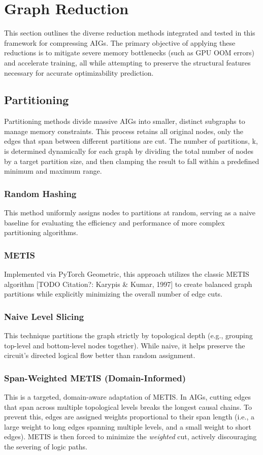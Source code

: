 \documentclass[paper=a4, fontsize=11pt]{scrartcl} %
\numberwithin{equation}{section} %
\numberwithin{figure}{section} %
\numberwithin{table}{section} %
\begin{document}
\section{Graph Reduction} 
This section outlines the diverse reduction methods integrated and tested in this framework for compressing AIGs. The primary objective of applying these reductions is to mitigate severe memory bottlenecks (such as GPU OOM errors) and accelerate training, all while attempting to preserve the structural features necessary for accurate optimizability prediction.


\subsection{Partitioning}
Partitioning methods divide massive AIGs into smaller, distinct subgraphs to manage memory constraints. This process retains all original nodes, only the edges that span between different partitions are cut. The number of partitions, k, is determined dynamically for each graph by dividing the total number of nodes by a target partition size, and then clamping the result to fall within a predefined minimum and maximum range.

\subsubsection{Random Hashing}
This method uniformly assigns nodes to partitions at random, serving as a naive baseline for evaluating the efficiency and performance of more complex partitioning algorithms.

\subsubsection{METIS}
Implemented via PyTorch Geometric, this approach utilizes the classic METIS algorithm [TODO Citation?: Karypis \& Kumar, 1997] to create balanced graph partitions while explicitly minimizing the overall number of edge cuts.

\subsubsection{Naive Level Slicing}
This technique partitions the graph strictly by topological depth (e.g., grouping top-level and bottom-level nodes together). While naive, it helps preserve the circuit's directed logical flow better than random assignment.


\subsubsection{Span-Weighted METIS (Domain-Informed)}
This is a targeted, domain-aware adaptation of METIS. In AIGs, cutting edges that span across multiple topological levels breaks the longest causal chains. To prevent this, edges are assigned weights proportional to their span length (i.e., a large weight to long edges spanning multiple levels, and a small weight to short edges). METIS is then forced to minimize the \textit{weighted} cut, actively discouraging the severing of logic paths.
\end{document}
